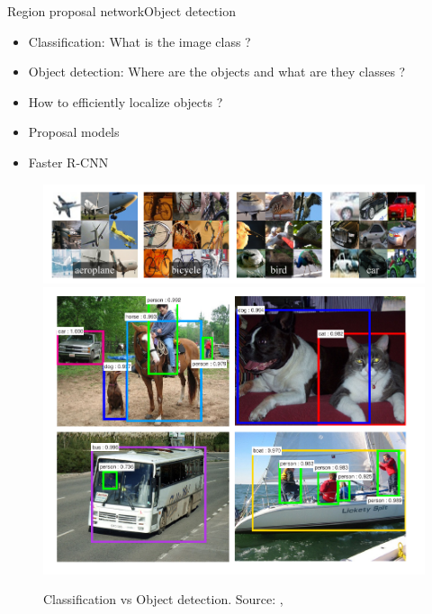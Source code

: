\documentclass[9pt,t,aspectratio=1610]{beamer}
\newcommand{\ratio}{0.5}
\begin{document}
\begin{frame}{Region proposal network}{Object detection}
\begin{itemize}
    \item Classification: What is the image class ?
    \pause
    \item Object detection: Where are the objects and what are they classes ?
    \pause
    \item How to efficiently localize objects ?
    \item Proposal models \cite{hosang2016what}
    \item Faster R-CNN \cite{ren2015faster}
\end{itemize}
\begin{figure}
    \includegraphics[width=\ratio\linewidth, trim=0 0 340 0, clip]{rcnn_images.png}
    \includegraphics[width=\ratio\linewidth]{faster_rnn_rpn_imageoutputs.png}
    \caption{Classification vs Object detection. Source: \cite{girshick2014rich},  \cite{ren2015faster}}
\end{figure}

\end{frame}
\end{document}
